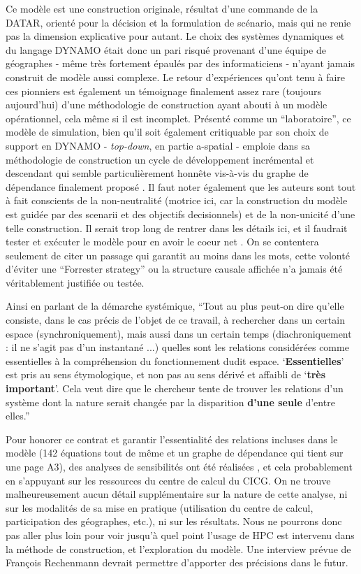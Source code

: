 Ce modèle est une construction originale, résultat d'une commande de la DATAR, orienté pour la décision et la formulation de scénario, mais qui ne renie pas la dimension explicative pour autant. Le choix des systèmes dynamiques et du langage DYNAMO était donc un pari risqué provenant d'une équipe de géographes - même très fortement épaulés par des informaticiens - n'ayant jamais construit de modèle aussi complexe. Le retour d'expériences qu'ont tenu à faire ces pionniers est également un témoignage finalement assez rare (toujours aujourd'hui) d'une méthodologie de construction ayant abouti à un modèle opérationnel, cela même si il est incomplet. Présenté comme un \enquote{laboratoire}, ce modèle de simulation, bien qu'il soit également critiquable par son choix de support en DYNAMO - \textit{top-down}, en partie a-spatial - emploie dans sa méthodologie de construction un cycle de développement incrémental et descendant qui semble particulièrement honnête vis-à-vis du graphe de dépendance finalement proposé . Il faut noter également que les auteurs sont tout à fait conscients de la non-neutralité (motrice ici, car la construction du modèle est guidée par des scenarii et des objectifs decisionnels) et de la non-unicité d'une telle construction. Il serait trop long de rentrer dans les détails ici, et il faudrait tester et exécuter le modèle pour en avoir le coeur net . On se contentera seulement de citer un passage qui garantit au moins dans les mots, cette volonté d'éviter une \foreignquote{english}{Forrester strategy} \autocite[7-8]{Batty2001} ou la structure causale affichée n'a jamais été véritablement justifiée ou testée.

Ainsi en parlant de la démarche systémique, \enquote{Tout au plus peut-on dire qu'elle consiste, dans le cas précis de l'objet de ce travail, à rechercher dans un certain espace (synchroniquement), mais aussi dans un certain temps (diachroniquement : il ne s'agit pas d'un instantané ...) quelles sont les relations considérées comme essentielles à la compréhension du fonctionnement dudit espace. \enquote{\textbf{Essentielles}} est pris au sens étymologique, et non pas au sens dérivé et affaibli de \enquote{\textbf{très important}}. Cela veut dire que le chercheur tente de trouver les relations d'un système dont la nature serait changée par la disparition \textbf{d'une seule} d'entre elles.} \autocite{AMORAL1983}

Pour honorer ce contrat et garantir l'essentialité des relations incluses dans le modèle (142 équations tout de même et un graphe de dépendance qui tient sur une page A3), des analyses de sensibilités ont été réalisées \autocite[34]{AMORAL1983}, et cela probablement en s'appuyant sur les ressources du centre de calcul du CICG. On ne trouve malheureusement aucun détail supplémentaire sur la nature de cette analyse, ni sur les modalités de sa mise en pratique (utilisation du centre de calcul, participation des géographes, etc.), ni sur les résultats. Nous ne pourrons donc pas aller plus loin pour voir jusqu'à quel point l'usage de HPC est intervenu dans la méthode de construction, et l'exploration du modèle. Une interview prévue de François Rechenmann devrait permettre d'apporter des précisions dans le futur.

